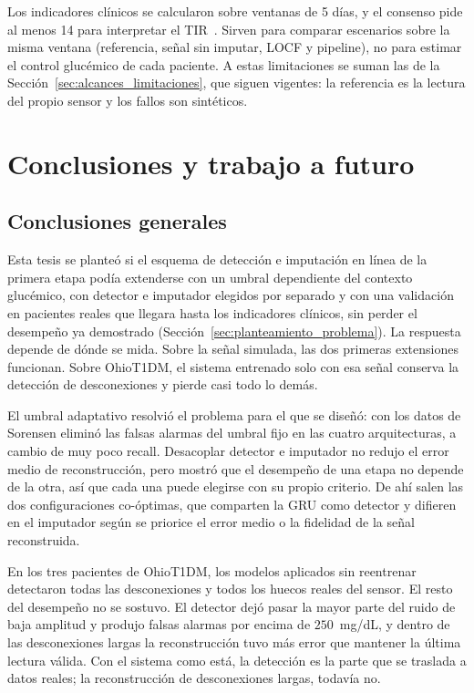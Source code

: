 \documentclass{report}
\begin{document}
Los indicadores clínicos se calcularon sobre ventanas de 5 días, y el consenso pide al menos 14 para interpretar el TIR~\cite{battelino2019}. Sirven para comparar escenarios sobre la misma ventana (referencia, señal sin imputar, LOCF y pipeline), no para estimar el control glucémico de cada paciente. A estas limitaciones se suman las de la Sección~\ref{sec:alcances_limitaciones}, que siguen vigentes: la referencia es la lectura del propio sensor y los fallos son sintéticos.

\chapter{Conclusiones y trabajo a futuro}
\label{cap:conclusiones}

\section{Conclusiones generales}
\label{sec:conclusiones_generales}

Esta tesis se planteó si el esquema de detección e imputación en línea de la primera etapa podía extenderse con un umbral dependiente del contexto glucémico, con detector e imputador elegidos por separado y con una validación en pacientes reales que llegara hasta los indicadores clínicos, sin perder el desempeño ya demostrado (Sección~\ref{sec:planteamiento_problema}). La respuesta depende de dónde se mida. Sobre la señal simulada, las dos primeras extensiones funcionan. Sobre OhioT1DM, el sistema entrenado solo con esa señal conserva la detección de desconexiones y pierde casi todo lo demás.
 
El umbral adaptativo resolvió el problema para el que se diseñó: con los datos de Sorensen eliminó las falsas alarmas del umbral fijo en las cuatro arquitecturas, a cambio de muy poco recall. Desacoplar detector e imputador no redujo el error medio de reconstrucción, pero mostró que el desempeño de una etapa no depende de la otra, así que cada una puede elegirse con su propio criterio. De ahí salen las dos configuraciones co-óptimas, que comparten la GRU como detector y difieren en el imputador según se priorice el error medio o la fidelidad de la señal reconstruida.
 
En los tres pacientes de OhioT1DM, los modelos aplicados sin reentrenar detectaron todas las desconexiones y todos los huecos reales del sensor. El resto del desempeño no se sostuvo. El detector dejó pasar la mayor parte del ruido de baja amplitud y produjo falsas alarmas por encima de $250$~mg/dL, y dentro de las desconexiones largas la reconstrucción tuvo más error que mantener la última lectura válida. Con el sistema como está, la detección es la parte que se traslada a datos reales; la reconstrucción de desconexiones largas, todavía no.
 
\end{document}
